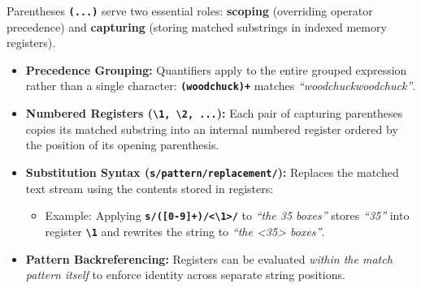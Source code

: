 \documentclass[10pt,a4paper]{article}
\newcommand{\rx}[1]{\texttt{\bfseries\color{inlinecode}#1}}
\begin{document}
\par\vspace{1pt}
Parentheses \rx{(...)} serve two essential roles: \textbf{scoping} (overriding operator precedence) and \textbf{capturing} (storing matched substrings in indexed memory registers).

\begin{itemize}[leftmargin=12pt, itemsep=1pt, parsep=0pt, topsep=0.5pt]
    \item \textbf{Precedence Grouping:} Quantifiers apply to the entire grouped expression rather than a single character: \rx{(woodchuck)+} matches \textit{``woodchuckwoodchuck''}.
    \item \textbf{Numbered Registers (\rx{\textbackslash 1, \textbackslash 2, ...}):} Each pair of capturing parentheses copies its matched substring into an internal numbered register ordered by the position of its opening parenthesis.
    \item \textbf{Substitution Syntax (\rx{s/pattern/replacement/}):} Replaces the matched text stream using the contents stored in registers:
    \begin{itemize}[leftmargin=10pt, itemsep=1pt, parsep=0pt, topsep=0.5pt]
        \item Example: Applying \rx{s/([0-9]+)/<\textbackslash 1>/} to \textit{``the 35 boxes''} stores \textit{``35''} into register \rx{\textbackslash 1} and rewrites the string to \textit{``the <35> boxes''}.
    \end{itemize}
    \item \textbf{Pattern Backreferencing:} Registers can be evaluated \textit{within the match pattern itself} to enforce identity across separate string positions.
\end{itemize}
\end{document}
